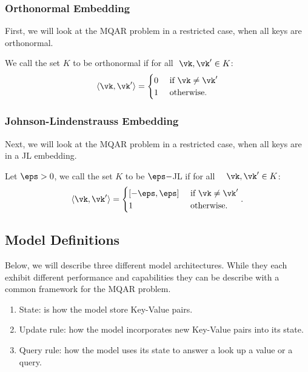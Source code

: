 \subsubsection{Orthonormal Embedding}
First, we will look at the MQAR problem in a restricted case, when all keys are orthonormal.
\begin{definition}\label{def:orthonorm}
We call the set $K$ to be orthonormal if for all $ \ \vk,\vk'\in K$:
    \[ \langle \vk, \vk' \rangle =
    \begin{cases}
        0 & \text{ if } \vk \neq \vk' \\
        1 & \text{ otherwise.}
    \end{cases}
\]
\end{definition}
\subsubsection{Johnson-Lindenstrauss Embedding}
Next, we will look at the MQAR problem in a restricted case, when all keys are in a JL embedding.
\begin{definition}\label{def:JL}
Let $\eps>0$, we call the set $K$ to be $\eps-$JL if for all $\quad \vk,\vk'\in K$:
\[  \langle \vk, \vk' \rangle =
    \begin{cases}
        [-\eps, \eps] & \text{ if } \vk \neq \vk' \\
        1 & \text{ otherwise.}
    \end{cases}.
\]
\end{definition}
\subsection{Model Definitions}
Below, we will describe three different model architectures. While they each exhibit different performance and capabilities they can be describe with a common framework for the MQAR problem.
\begin{enumerate} [leftmargin=*]
\item State: is how the model store Key-Value pairs. \item Update rule: how the model incorporates new Key-Value pairs into its state.
\item Query rule: how the model uses its state to answer a look up a value or a query.
\end{enumerate}
